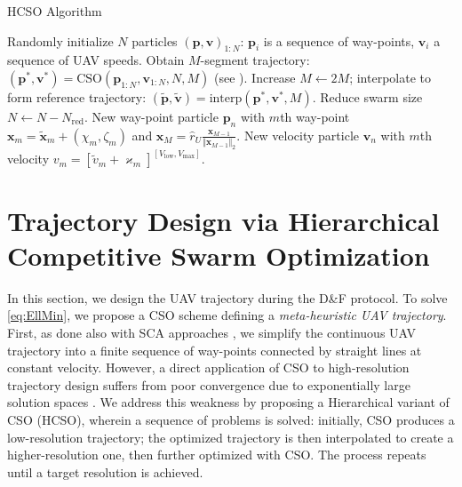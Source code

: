\documentclass[10pt, twocolumn]{IEEEtran}
\theoremstyle{plain}
\theoremstyle{definition}
\theoremstyle{remark}
\begin{document}
\begin{algorithm*} [t]
\caption{HCSO Algorithm}\label{A3}
    \begin{algorithmic}[1]
        \scriptsize
    	\State Randomly initialize $N$ particles $(\mathbf p,\mathbf v)_{1:N}$: $\mathbf p_i$ is a sequence of way-points,  $\mathbf{v}_{i}$ a sequence of UAV speeds.
    		\State Obtain $M$-segment trajectory: $(\mathbf{p}^{*},\mathbf{v}^{*}){=}\mathrm{CSO}(\mathbf{p}_{1:N},\mathbf{v}_{1:N},N,M)$ (see \cite{CSO}). 
    		\State Increase $M{\gets}2M$; interpolate to form reference trajectory: $(\tilde{\mathbf{p}},\tilde{\mathbf{v}}){=}\mathrm{interp}(\mathbf{p}^{*},\mathbf{v}^{*},M)$. 
    		\State Reduce swarm size $N{\gets}N{-}N_{\mathrm{red}}$.
              \State New way-point particle $\mathbf p_{n}$ with $m$th way-point $\mathbf x_m=\tilde{\mathbf{x}}_{m}{+}(\chi_{m},\zeta_{m})$
              and $\mathbf x_M=\hat r_U\frac{\mathbf{x}_{M{-}1}}{\Vert\mathbf{x}_{M{-}1}\Vert_2}$.
              \State New velocity particle $\mathbf v_{n}$ with $m$th velocity $v_m=[\tilde{v}_{m}{+}\varkappa_{m}]^{[V_{\mathrm{low}},V_{\mathrm{max}}]}$. 
    		\EndFor
    	\EndWhile
    \end{algorithmic}
\end{algorithm*}
\vspace{-2mm}

\section{Trajectory Design via Hierarchical Competitive Swarm Optimization}\label{S4}
In this section, we design the UAV trajectory during the D\&F protocol. To solve \eqref{eq:EllMin}, we propose a CSO scheme \cite{CSO} defining a \emph{meta-heuristic UAV trajectory}. First, as done also with SCA approaches \cite{SCA,CSCA-ADMM,EnergyEfficientUAVs}, we simplify the continuous UAV trajectory into a finite sequence of way-points connected by straight lines at constant velocity. However, a direct application of CSO to high-resolution trajectory design suffers from poor convergence due to exponentially large solution spaces \cite{HighDimensionality}. We address this weakness by proposing a Hierarchical variant of CSO (HCSO), wherein a sequence of problems is solved: initially, CSO produces a low-resolution trajectory; the optimized trajectory is then interpolated to create a higher-resolution one, then further optimized with CSO. The process repeats until a target resolution is achieved.
\end{document}
